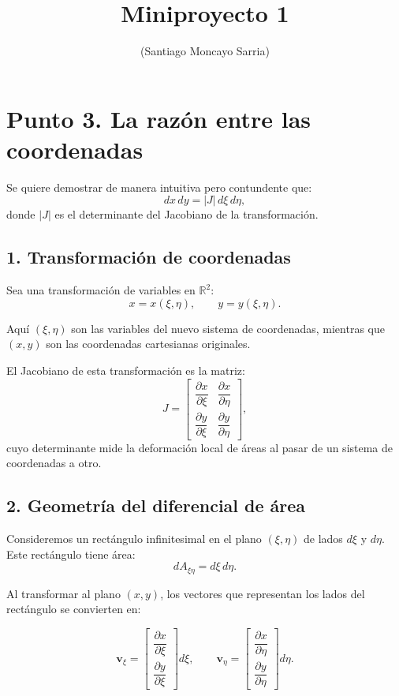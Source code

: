 \documentclass[a4paper,11pt]{article}
\title{Miniproyecto 1}
\author{(Santiago Moncayo Sarria)}
\date{}
\begin{document}
\maketitle
\section*{Punto 3. La razón entre las coordenadas}

Se quiere demostrar de manera intuitiva pero contundente que:
\[
dx\,dy = |J|\, d\xi\, d\eta,
\]
donde $|J|$ es el determinante del Jacobiano de la transformación.

\subsection*{1. Transformación de coordenadas}

Sea una transformación de variables en $\mathbb{R}^2$:
\[
x = x(\xi,\eta), \qquad y = y(\xi,\eta).
\]

Aquí $(\xi,\eta)$ son las variables del nuevo sistema de coordenadas, mientras que $(x,y)$ 
son las coordenadas cartesianas originales.

El Jacobiano de esta transformación es la matriz:
\[
J = 
\begin{bmatrix}
\dfrac{\partial x}{\partial \xi} & \dfrac{\partial x}{\partial \eta} \\[1.2ex]
\dfrac{\partial y}{\partial \xi} & \dfrac{\partial y}{\partial \eta}
\end{bmatrix},
\]
cuyo determinante mide la deformación local de áreas al pasar de un sistema de coordenadas a otro.

\subsection*{2. Geometría del diferencial de área}

Consideremos un rectángulo infinitesimal en el plano $(\xi,\eta)$ de lados $d\xi$ y $d\eta$.  
Este rectángulo tiene área:
\[
dA_{\xi\eta} = d\xi\, d\eta.
\]

Al transformar al plano $(x,y)$, los vectores que representan los lados del rectángulo se convierten en:

\[
\mathbf{v}_\xi = 
\begin{bmatrix}
\dfrac{\partial x}{\partial \xi} \\
\dfrac{\partial y}{\partial \xi}
\end{bmatrix} d\xi, 
\qquad
\mathbf{v}_\eta =
\begin{bmatrix}
\dfrac{\partial x}{\partial \eta} \\
\dfrac{\partial y}{\partial \eta}
\end{bmatrix} d\eta.
\]
\end{document}

